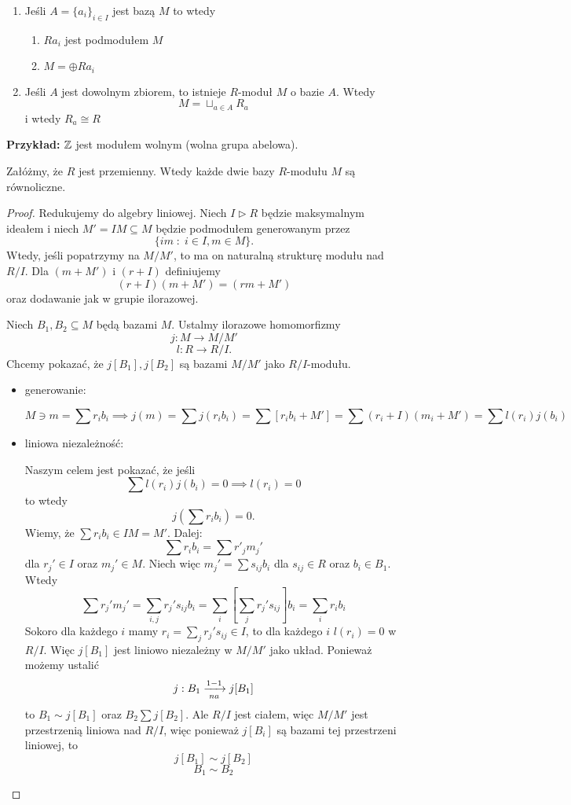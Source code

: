 \begin{remark}
  \begin{enumerate}
    \item Jeśli $A=\{a_i\}_{i\in I}$ jest bazą $M$ to wtedy
      \begin{enumerate}
        \item $Ra_i$ jest  podmodułem $M$
        \item $M=\oplus Ra_i$
      \end{enumerate}
    \item Jeśli $A$ jest dowolnym zbiorem, to istnieje $R$-moduł $M$ o bazie $A$. Wtedy
        $$M=\sqcup_{a\in A} R_a$$
        i wtedy $R_a\cong R$
  \end{enumerate}
\end{remark}
\textbf{Przykład:} $\mathbb{Z}$ jest modułem wolnym (wolna grupa abelowa).

\begin{theorem}
  Załóżmy, że $R$ jest przemienny. Wtedy każde dwie bazy $R$-modułu $M$ są równoliczne.
\end{theorem}
\begin{proof}
  Redukujemy do algebry liniowej. Niech $I\triangleright R$ będzie maksymalnym ideałem i niech $M'=IM\subseteq M$ będzie podmodułem generowanym przez
  $$\{im\;:\;i\in I,m\in M\}.$$
  Wtedy, jeśli popatrzymy na $M/M'$, to ma on naturalną strukturę modułu nad $R/I$. Dla $(m+M')$ i $(r+I)$ definiujemy
  $$(r+I)(m+M')=(rm+M')$$
  oraz dodawanie jak w grupie ilorazowej.

  Niech $B_1,B_2\subseteq M$ będą bazami $M$. Ustalmy ilorazowe homomorfizmy
  $$j:M\to M/M'$$
  $$l:R\to R/I.$$
  Chcemy pokazać, że $j[B_1],j[B_2]$ są bazami $M/M'$ jako $R/I$-modułu.
  \begin{itemize}
    \item generowanie:
      
      $$M\ni m=\sum r_ib_i\implies j(m)=\sum j(r_ib_i)=\sum [r_ib_i+M']=\sum (r_i+I)(m_i+M')=\sum l(r_i)j(b_i)$$
    \item liniowa niezależność:

      Naszym celem jest pokazać, że jeśli 
      $$\sum l(r_i)j(b_i)=0\implies l(r_i)=0$$
      to wtedy
      $$j(\sum r_ib_i)=0.$$
      Wiemy, że $\sum r_ib_i\in IM=M'$. Dalej:
      $$\sum r_ib_i=\sum r'_jm_j'$$
      dla $r_j'\in I$ oraz $m_j'\in M$. Niech więc $m_j'=\sum s_{ij}b_i$ dla $s_{ij}\in R$ oraz $b_i\in B_1$. Wtedy
      $$\sum r_j'm_j'=\sum_{i,j} r_j's_{ij}b_i=\sum_i\left[\sum_j r_j's_{ij}\right]b_i=\sum_ir_ib_i$$
      Sokoro dla każdego $i$ mamy $r_i=\sum_jr_j's_{ij}\in I$, to dla każdego $i$ $l(r_i)=0$ w $R/I$. Więc $j[B_1]$ jest liniowo niezależny w $M/M'$ jako układ. Ponieważ możemy ustalić
      $$j:B_1\xrightarrow[na]{1-1} j[B_1]$$
      to $B_1\sim j[B_1]$ oraz $B_2\sum j[B_2]$. Ale $R/I$ jest ciałem, więc $M/M'$ jest przestrzenią liniowa nad $R/I$, więc ponieważ $j[B_i]$ są bazami tej przestrzeni liniowej, to
      $$j[B_1]\sim j[B_2]$$
      $$B_1\sim B_2$$
  \end{itemize}
\end{proof}

